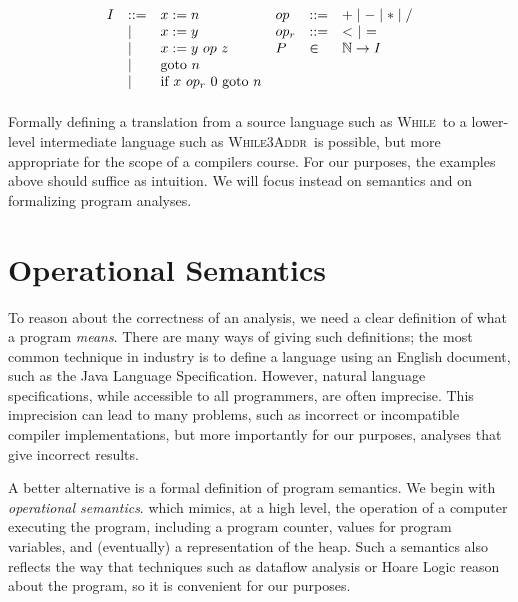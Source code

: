 \documentclass[11pt]{article}
\def\Natural{\mathbb{N}}
\def\prop{\textsf{\,\,prop}}
\def\thm{\textsf{\,\,thm}}
\def\implies{\Rightarrow}
\def\While{\textsc{While}}
\def\WhileThAddr{\textsc{While3Addr}}
\begin{document}
\[
\begin{array}{llllll}
I & \bnfdef & x := n & op & \bnfdef & + \bnfalt - \bnfalt * \bnfalt / \\
  & \bnfalt & x := y & op_r & \bnfdef & <~ \bnfalt ~=~  \\
  & \bnfalt & x := y ~op~ z & P & \in & \Natural \rightarrow I\\
  & \bnfalt & \mbox{goto}~n \\
  & \bnfalt & \mbox{if}~x~op_r~0~\mbox{goto}~n \\[1ex]
\end{array}
\]

\noindent Formally defining a translation from a source language such as \While~to
a lower-level intermediate language such as \WhileThAddr~is possible, but
 more appropriate for the scope of a compilers course.  For our purposes, the 
 examples above should suffice as intuition.  We will focus
instead on semantics and on formalizing program analyses.


\def\prop{\textsf{\,\,prop}}
\def\thm{\textsf{\,\,thm}}
\def\implies{\Rightarrow}

\newcommand{\join}{\sqcup}
\newcommand{\meet}{\sqcap}
\newcommand{\alap}{\sqsubseteq}


\section{Operational Semantics} 

To reason about the correctness of an analysis, we need a clear definition of
what a program \textit{means}.  There are many ways of giving such definitions;
the most common technique in industry is to define a language using an English
document, such as the Java Language Specification.  However, natural
language specifications, while accessible to all programmers, are often
imprecise.  This imprecision can lead to many problems, such as incorrect
or incompatible compiler implementations, but more importantly for our
purposes, analyses that give incorrect results.

A better alternative is a formal definition of program semantics.  We begin with
\textit{operational semantics}.
which mimics, at a high level, the operation of a computer
executing the program, including a program counter, values for program
variables, and (eventually) a representation of the heap.  Such a semantics also
reflects the way that techniques such as dataflow analysis or Hoare Logic reason
about the program, so it is convenient for our purposes.
\end{document}
